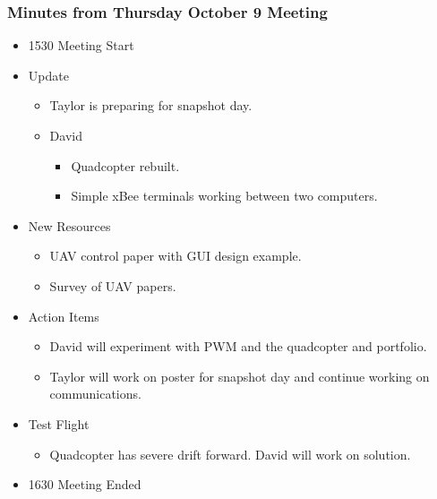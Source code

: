 \documentclass[pdftex,11pt]{article}
\begin{document}
\subsubsection[short]{Minutes from Thursday October 9 Meeting}
\begin{itemize}
	\item 1530 \indent Meeting Start
	\item Update
	\begin{itemize}
		\item  Taylor is preparing for snapshot day.
		\item David
		\begin{itemize}
			\item Quadcopter rebuilt.
			\item Simple xBee terminals working between two computers.
		\end{itemize}
	\end{itemize}
	\item New Resources
		\begin{itemize}
			\item UAV control paper with GUI design example.
			\item Survey of UAV papers.
		\end{itemize}
	\item Action Items
	\begin{itemize}
		\item David will experiment with PWM and the quadcopter and  portfolio.
		\item Taylor will work on poster for snapshot day and continue working on communications.
	\end{itemize}
	\item Test Flight
	\begin{itemize}
		\item  Quadcopter has severe drift forward. David will work on solution.
	\end{itemize}
	\item 1630 \indent Meeting Ended
\end{itemize}	


\clearpage

\clearpage
\appendix
\appendixpage	
\addappheadtotoc
\end{document}
